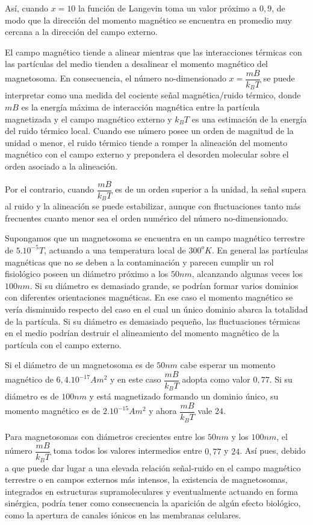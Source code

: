 Así, cuando $x=10$ la función de Langevin toma un valor próximo a $0,9$, de modo que la dirección del momento magnético se encuentra en promedio muy cercana a la dirección del campo externo.

El campo magnético tiende a alinear mientras que las interacciones térmicas con las partículas del medio tienden a desalinear el momento magnético del magnetosoma. En consecuencia, el número no-dimensionado $x=\dfrac{mB}{k_{B}T}$ se puede interpretar como una medida del cociente señal magnética/ruido térmico, donde $mB$ es la energía máxima de interacción magnética entre la partícula magnetizada y el campo magnético externo y $k_{B}T$ es una estimación de la energía del ruido térmico local. Cuando ese número posee un orden de magnitud de la unidad o menor, el ruido térmico tiende a romper la alineación del momento magnético con el campo externo y prepondera el desorden molecular sobre el orden asociado a la alineación.

Por el contrario, cuando $\dfrac{mB}{k_{B}T}$ es de un orden superior a la unidad, la señal supera al ruido y la alineación se puede estabilizar, aunque con fluctuaciones tanto más frecuentes cuanto menor sea el orden numérico del número no-dimensionado.

Supongamos que un magnetosoma se encuentra en un campo magnético terrestre de $5.10^{-5} T$, actuando a una temperatura local de $300^{o}K$.
En general las partículas magnéticas que no se deben a la contaminación y parecen cumplir un rol fisiológico poseen un diámetro próximo a los $50 nm$, alcanzando algunas veces los $100 nm$. Si su diámetro es demasiado grande, se podrían formar varios dominios con diferentes orientaciones magnéticas. En ese caso el momento magnético se vería disminuido respecto del caso en el cual un único dominio abarca la totalidad de la partícula. Si su diámetro es demasiado pequeño, las fluctuaciones térmicas en el medio podrían destruir el alineamiento del momento magnético de la partícula con el campo externo.

Si el diámetro de un magnetosoma es de $50 nm$ cabe esperar un momento magnético de $6,4.10^{-17} Am^{2}$ y en este caso $\dfrac{mB}{k_{B}T}$ adopta como valor $0,77$. Si su diámetro es de $100 nm$ y está magnetizado formando un dominio único, su momento magnético es de $2.10^{-15} Am^{2}$ y ahora $\dfrac{mB}{k_{B}T}$ vale $24$.


Para magnetosomas con diámetros crecientes entre los $50 nm$ y los $100 nm$, el número $\dfrac{mB}{k_{B}T}$ toma todos los valores intermedios entre $0,77$ y $24$. Así pues, debido a que puede dar lugar a una elevada relación señal-ruido en el campo magnético terrestre o en campos externos más intensos, la existencia de magnetosomas, integrados en estructuras supramoleculares y eventualmente actuando en forma sinérgica, podría tener como consecuencia la aparición de algún efecto biológico, como la apertura de canales iónicos en las membranas celulares.

